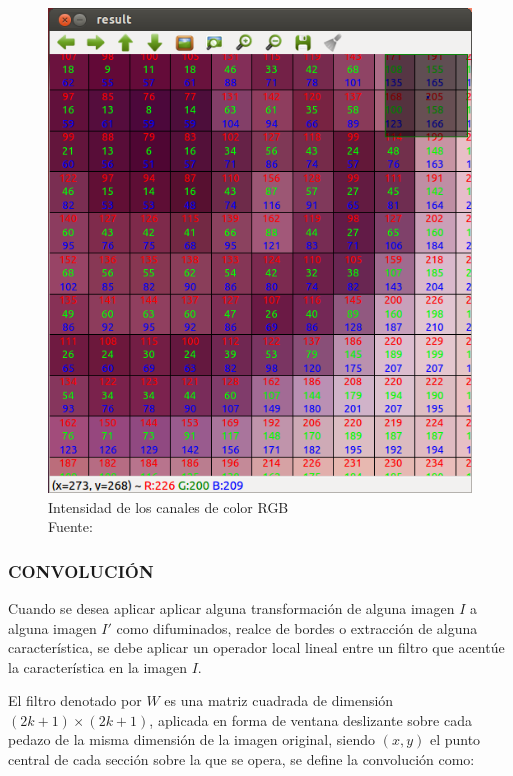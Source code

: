        \begin{figure}[H]
            \centering
            \includegraphics[scale=0.4]{imagenes/pixels}
            \caption[Intensidad de los canales de color RGB]{Intensidad de los canales de color RGB\\ Fuente: \citep{montabone_2012}}
        \end{figure}
		
        \subsubsection{CONVOLUCIÓN}
        Cuando se desea aplicar aplicar alguna transformación de alguna imagen $I$ a alguna imagen $I'$ como difuminados, realce de bordes o extracción de alguna característica, se debe aplicar un operador local lineal entre un filtro que acentúe la característica en la imagen $I$.
        
        El filtro denotado por $W$ es una matriz cuadrada de dimensión $(2k+1) \times (2k+1)$, aplicada en forma de ventana deslizante sobre cada pedazo de la misma dimensión de la imagen original, siendo $(x, y)$ el punto central de cada sección sobre la que se opera, se define la convolución como:
        
